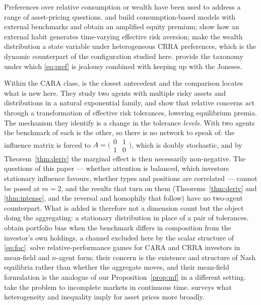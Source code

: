 Preferences over relative consumption or wealth have been used to address a
range of asset-pricing questions. \cite{abel} and \cite{gali} build
consumption-based models with external benchmarks and obtain an amplified
equity premium; \cite{campbell} show how an external habit generates
time-varying effective risk aversion; \cite{chankogan} make the wealth
distribution a state variable under heterogeneous CRRA preferences, which is
the dynamic counterpart of the configuration studied here. \cite{dupor}
provide the taxonomy under which \eqref{eq:pref} is jealousy combined with
keeping up with the Joneses.

Within the CARA class, \cite{degennaro} is the closest antecedent and the
comparison locates what is new here. They study two agents with multiple risky
assets and distributions in a natural exponential family, and show that relative
concerns act through a transformation of effective risk tolerances, lowering
equilibrium premia. The mechanism they identify is a change in the tolerance
\emph{levels}. With two agents the benchmark of each is the other, so there is
no network to speak of: the influence matrix is forced to
$A=\big(\begin{smallmatrix}0&1\\1&0\end{smallmatrix}\big)$, which is doubly
stochastic, and by Theorem~\ref{thm:deriv} the marginal effect is then
necessarily non-negative. The questions of this paper --- whether attention is
balanced, which investors stationary influence favours, whether types and
positions are correlated --- cannot be posed at $m=2$, and the results that turn
on them (Theorems~\ref{thm:deriv} and \ref{thm:intense}, and the reversal and
homophily that follow) have no two-agent counterpart. What is added is therefore
not a dimension count but the object doing the aggregating: a stationary
distribution in place of a pair of tolerances. \cite{demarzo04} obtain portfolio bias when
the benchmark differs in composition from the investor's own holdings, a
channel excluded here by the scalar structure of \eqref{eq:foc}.
\cite{lacker} solve relative-performance games for CARA and CRRA investors in
mean-field and $n$-agent form; their concern is the existence and structure of
Nash equilibria rather than whether the aggregate moves, and their mean-field
formulation is the analogue of our Proposition~\ref{prop:mf} in a different
setting. \cite{kraft} take the problem to incomplete markets in continuous
time. \cite{panageas} surveys what heterogeneity and inequality imply for asset
prices more broadly.

